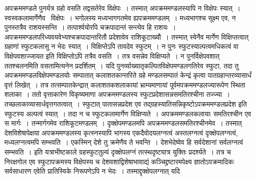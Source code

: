 \documentclass[11pt, openany]{book}
\begin{document}
\noindent अपक्रममण्डले पुनर्यत्र ग्रहो वसति तद्वसतेरेव विक्षेपः~। तस्मात् अपक्रममण्डलस्यापि न विक्षेपः स्यात्~। स्वस्वकलामार्गेणैव~ विक्षेपः~। भगोलस्य मध्यभागगतमेव ह्यपक्रममण्डलम्~। मध्यभागश्च सूक्ष्म एव, न पुनस्तत्रैव राशयस्सन्ति~। तत्पार्श्वयोरपि चक्रपादान्तं सन्त्येव हि राशयः~। अपक्रममण्डलपरिध्यवयवेभ्यश्चक्रपादान्तरितौ प्रदेशावेव राशिकूटाख्यौ~। तस्मात् स्वेनैव मार्गेण विक्षिप्तत्वात् ग्रहाणां स्फुटकलासु न भेदः स्यात्~। विक्षिप्तेऽपि तावदेव स्फुटम्~। न पुनः स्फुटस्याल्पत्वमधिकत्वं वा विक्षेपवशाज्जायत इति विक्षिप्तोऽपि तत्रैव वसति~। तत्र वसन्नेव विक्षिप्यते~। न पुनर्विक्षेपवशात् ततश्चलनमिति {\qt वसता}मित्यनेन प्रदर्शितम्~। यदि पुनर्व्याख्यातृकल्पितविक्षेपमण्डलगतिरेव स्फुटा, तदा तु अपक्रममण्डलविक्षेपमण्डलयोः सम्पातात् कलाशतकान्तरिते ग्रहे मण्डलसम्पातं केन्द्रं कृत्वा पातग्रहान्तरव्यासार्धं वृत्तं लिखेत्~। तत्र तत्सम्पातकेन्द्रात् कलाशतकशलाकायां भ्राम्यमाणायां पूर्वमपक्रममण्डलज्यारूपेण स्थिता शलाका~। ततो वृत्ताकारेण विकृष्यमाणा अपक्रममण्डलस्य स्फुटप्रदेशासन्नसमतिरश्चीना तज्ज्या~। तच्छलाकाव्यासार्धवृत्तगतत्वात्~। स्फुटात् पातासन्नप्रदेश एव तद्ग्रहस्यातिसन्निकृष्टोऽपक्रममण्डलप्रदेश इति स्फुटस्य अल्पत्वं स्यात्~। तदा न च स्फुटकलामार्गेण विक्षिप्यते~। अपक्रममण्डलकलायाः समतिरश्चीन एव स मार्गः~। तन्मार्गगमेव राशिकूटमण्डलम्~। दृक्क्षेपमण्डलमपि अपक्रममण्डलसमतिरश्चीनमेव~। तस्मात् देशविशेषापेक्षया अपक्रममण्डलस्य कृत्स्नस्यापि भागस्य एकदैवोदयलग्नत्वं अस्तलग्नत्वं दृक्क्षेपलग्नत्वं, मध्यलग्नत्वमपि सम्भवति~। एकस्मिन् देशे तु क्रमेणैव ते भवन्ति~। देशभेदेष्वेव हि सर्वदेशानां सर्वलग्नत्वं सम्भवति~। इति यत्राभीष्टकाले ग्रहस्फुटतुल्यं दृक्क्षेपलग्नं तत्स्थदृष्ट्यात्र
युक्तिः प्रदर्श्यते~। तत्र च निरक्षगोल एव स्फुटापक्रमस्य विक्षेपस्य च देशवशाद्विशेषाभावाद्यं कञ्चिद्द्रष्टारमपेक्ष्य ज्ञातोऽपक्रमादिकः सर्वसाधारण
एवेति प्रातिस्विके निरूपणेऽपि न भेदः~। तस्माद्दृक्क्षेपलग्नात् यदि

\newpage
\end{document}
